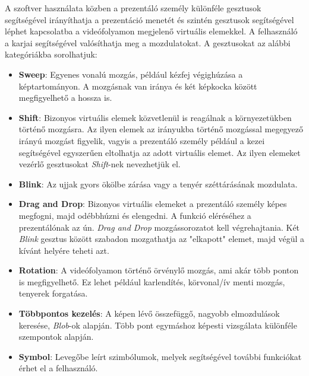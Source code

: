 

A szoftver használata közben a prezentáló személy különféle gesztusok segítségével irányíthatja a prezentáció menetét és szintén gesztusok segítségével léphet kapcsolatba a videófolyamon megjelenő virtuális elemekkel. A felhasználó a karjai segítségével valósíthatja meg a mozdulatokat. A gesztusokat az alábbi kategóriákba sorolhatjuk:

\begin{itemize}
	\item \textbf{Sweep}: Egyenes vonalú mozgás, például kézfej végighúzása a képtartományon. A mozgásnak van iránya és két képkocka között megfigyelhető a hossza is.
	\item \textbf{Shift}: Bizonyos virtuális elemek közvetlenül is reagálnak a környezetükben történő mozgásra. Az ilyen elemek az irányukba történő mozgással megegyező irányú mozgást figyelik, vagyis a prezentáló személy például a kezei segítségével egyszerűen eltolhatja az adott virtuális elemet. Az ilyen elemeket vezérlő gesztusokat \textit{Shift}-nek nevezhetjük el.
	\item \textbf{Blink}: Az ujjak gyors ökölbe zárása vagy a tenyér széttárásának mozdulata.
	\item \textbf{Drag and Drop}: Bizonyos virtuális elemeket a prezentáló személy képes megfogni, majd odébbhúzni és elengedni. A funkció eléréséhez a prezentálónak az ún. \textit{Drag and Drop} mozgássorozatot kell végrehajtania. Két \textit{Blink} gesztus között szabadon mozgathatja az "elkapott" elemet, majd végül a kívánt helyére teheti azt.
	\item \textbf{Rotation}: A videófolyamon történő örvénylő mozgás, ami akár több ponton is megfigyelhető. Ez lehet például karlendítés, körvonal/ív menti mozgás, tenyerek forgatása.
	\item \textbf{Többpontos kezelés}: A képen lévő összefüggő, nagyobb elmozdulások keresése, \textit{Blob}-ok alapján. Több pont egymáshoz képesti vizsgálata különféle szempontok alapján.
	\item \textbf{Symbol}: Levegőbe leírt szimbólumok, melyek segítségével további funkciókat érhet el a felhasználó.
\end{itemize}



